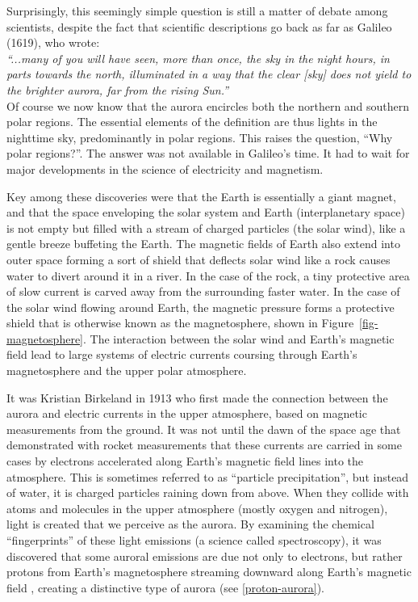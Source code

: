 \documentclass{article}
\renewcommand{\cite}[1]{\parencite{#1}}
\begin{document}
Surprisingly, this seemingly simple question is still a matter of debate among scientists, despite the fact that scientific descriptions go back as far as Galileo (1619), who wrote:\\
\textit{``...many of you will have seen, more than once, the sky in the night hours, in parts towards the north, illuminated in a way that the clear [sky] does not yield to the brighter aurora, far from the rising Sun.''}\\
Of course we now know that the aurora encircles both the northern and southern polar regions. The essential elements of the definition are thus lights in the nighttime sky, predominantly in polar regions. This raises the question, ``Why polar regions?''. The answer was not available in Galileo's time. It had to wait for major developments in the science of electricity and magnetism. 

Key among these discoveries were that the Earth is essentially a giant magnet, and that the space enveloping the solar system and Earth (interplanetary space) is not empty but filled with a stream of charged particles (the solar wind), like a gentle breeze buffeting the Earth. The magnetic fields of Earth also extend into outer space forming a sort of shield that deflects solar wind like a rock causes water to divert around it in a river. In the case of the rock, a tiny protective area of slow current is carved away from the surrounding faster water. In the case of the solar wind flowing around Earth, the magnetic pressure forms a protective shield that is otherwise known as the magnetosphere, shown in Figure~\ref{fig-magnetosphere}. The interaction between the solar wind and Earth's magnetic field lead to large systems of electric currents coursing through Earth's magnetosphere and the upper polar atmosphere. 

It was Kristian Birkeland in 1913 who first made the connection between the aurora and electric currents in the upper atmosphere, based on magnetic measurements from the ground. It was not until the dawn of the space age that \textcite{McIlwain1960} demonstrated with rocket measurements that these currents are carried in some cases by electrons accelerated along Earth's magnetic field lines into the atmosphere. This is sometimes referred to as ``particle precipitation'', but instead of water, it is charged particles raining down from above. When they collide with atoms and molecules in the upper atmosphere (mostly oxygen and nitrogen), light is created that we perceive as the aurora. By examining the chemical ``fingerprints'' of these light emissions (a science called spectroscopy), it was discovered that some auroral emissions are due not only to electrons, but rather protons from Earth's magnetosphere streaming downward along Earth's magnetic field \cite{Vegard1939}, creating a distinctive type of aurora (see \ref{proton-aurora}).  
\end{document}
